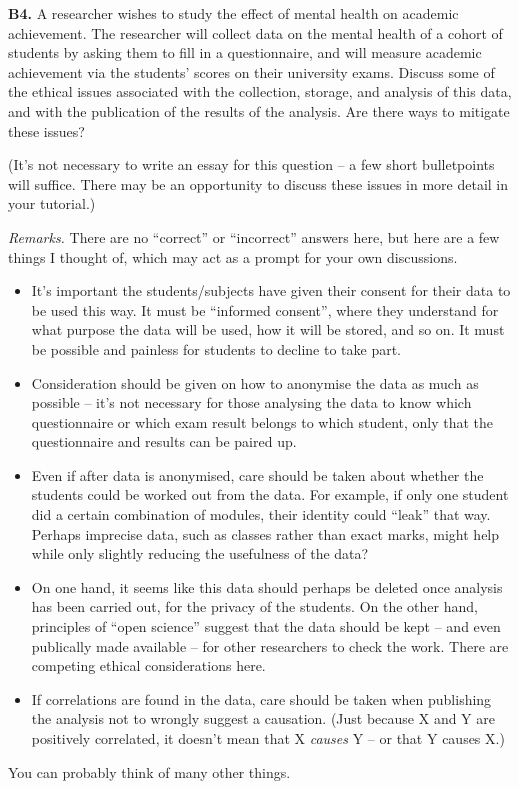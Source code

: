 \documentclass[
  a4paper,
]{book}
\providecommand{\tightlist}{%
  \setlength{\itemsep}{0pt}\setlength{\parskip}{0pt}}
\theoremstyle{definition}
\theoremstyle{definition}
\theoremstyle{definition}
\theoremstyle{definition}
\theoremstyle{remark}
\begin{document}
\textbf{B4.} A researcher wishes to study the effect of mental health on academic achievement. The researcher will collect data on the mental health of a cohort of students by asking them to fill in a questionnaire, and will measure academic achievement via the students' scores on their university exams. Discuss some of the ethical issues associated with the collection, storage, and analysis of this data, and with the publication of the results of the analysis. Are there ways to mitigate these issues?

(It's not necessary to write an essay for this question -- a few short bulletpoints will suffice. There may be an opportunity to discuss these issues in more detail in your tutorial.)

\begin{myanswers}
\emph{Remarks.} There are no ``correct'' or ``incorrect'' answers here, but here are a few things I thought of, which may act as a prompt for your own discussions.

\begin{itemize}
\tightlist
\item
  It's important the students/subjects have given their consent for their data to be used this way. It must be ``informed consent'', where they understand for what purpose the data will be used, how it will be stored, and so on. It must be possible and painless for students to decline to take part.
\item
  Consideration should be given on how to anonymise the data as much as possible -- it's not necessary for those analysing the data to know which questionnaire or which exam result belongs to which student, only that the questionnaire and results can be paired up.
\item
  Even if after data is anonymised, care should be taken about whether the students could be worked out from the data. For example, if only one student did a certain combination of modules, their identity could ``leak'' that way. Perhaps imprecise data, such as classes rather than exact marks, might help while only slightly reducing the usefulness of the data?
\item
  On one hand, it seems like this data should perhaps be deleted once analysis has been carried out, for the privacy of the students. On the other hand, principles of ``open science'' suggest that the data should be kept -- and even publically made available -- for other researchers to check the work. There are competing ethical considerations here.
\item
  If correlations are found in the data, care should be taken when publishing the analysis not to wrongly suggest a causation. (Just because X and Y are positively correlated, it doesn't mean that X \emph{causes} Y -- or that Y causes X.)
\end{itemize}

You can probably think of many other things.

\end{myanswers}
\end{document}

